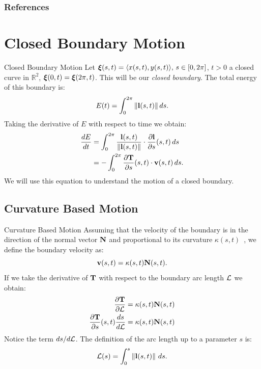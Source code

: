 \documentclass[usenames,dvipsnames]{beamer}
\begin{document}
\appendix
\begin{frame}[allowframebreaks]
    \frametitle{References}
    
    
\end{frame}



\section{Closed Boundary Motion}
\begin{frame}{Closed Boundary Motion}
Let $\bm{\xi}(s,t) = \langle x(s,t), y(s,t) \rangle,\, s \in [0, 2\pi]$, $t >  0$ a closed curve in $\mathbb{R}^2$, \ie $\bm{\xi}(0, t) = \bm{\xi}(2\pi,t)$. This will be our \emph{closed boundary}. The total energy of this boundary is:
\begin{equation*}
    E(t) = \int_0^{2\pi} \left\lVert\mathbf{l}(s,t)\right\rVert ds.
\end{equation*}
Taking the derivative of $E$ with respect to time we obtain:
\begin{align*}
    \frac{dE}{dt} &= \int_0^{2\pi} \frac{\mathbf{l}(s,t)}{\left\lVert\mathbf{l}(s,t)\right\rVert}\cdot \frac{\partial \mathbf{l}}{\partial s}(s,t)\,ds\\
    &= -\int_0^{2\pi} \frac{\partial \mathbf{T}}{\partial s}(s,t)\cdot \mathbf{v}(s,t)\, ds.
\end{align*}
We will use this equation to understand the motion of a closed boundary.
\end{frame}

\subsection{Curvature Based Motion}
\begin{frame}{Curvature Based Motion}
Assuming that the velocity of the boundary is in the direction of the normal vector $\mathbf{N}$ and proportional to its curvature $\kappa(s,t)$~\cite{Kinderlehrer2006}, we define the boundary velocity as:
\begin{equation*}
    \mathbf{v}(s,t) = \kappa(s,t)\mathbf{N}(s,t).
\end{equation*}
If we take the derivative of $\mathbf{T}$ with respect to the boundary arc length $\mathcal{L}$ we obtain:
\begin{align}
    \frac{\partial \mathbf{T}}{\partial \mathcal{L}} &= \kappa(s,t)\mathbf{N}(s,t) \nonumber\\
    \frac{\partial \mathbf{T}}{\partial s}(s,t) \frac{ds}{d\mathcal{L}}&= \kappa(s,t)\mathbf{N}(s,t)
    \label{eq:dTds_dsdAL}
\end{align}
Notice the term $ds/d\mathcal{L}$. The definition of the arc length up to a parameter $s$ is:
\begin{equation*}
    \mathcal{L}(s) = \int_0^s \left\lVert\mathbf{l}(s,t)\right\rVert\, ds.
\end{equation*}
\end{frame}
\end{document}
